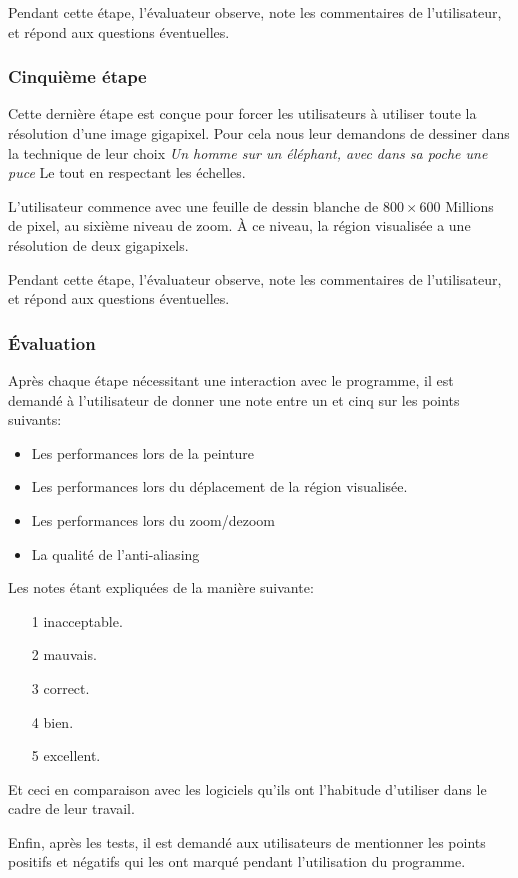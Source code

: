 			Pendant cette étape, l'évaluateur observe, note les commentaires de l'utilisateur, et répond aux questions
			éventuelles. 

			\subsubsection{Cinquième étape}
			Cette dernière étape est conçue pour forcer les utilisateurs à utiliser toute la résolution d'une image
			gigapixel. Pour cela nous leur demandons de dessiner dans la technique de leur choix \emph{Un homme sur
			un éléphant, avec dans sa poche une puce} Le tout en respectant les échelles. 

			L'utilisateur commence avec une feuille de dessin blanche de $800 \times 600$ Millions de pixel, au sixième
			niveau de zoom. À ce niveau, la région visualisée a une résolution de deux gigapixels.

			Pendant cette étape, l'évaluateur observe, note les commentaires de l'utilisateur, et répond aux questions
			éventuelles. 

			\subsubsection{Évaluation}
			Après chaque étape nécessitant une interaction avec le programme, il est demandé à l'utilisateur de donner
			une note entre un et cinq sur les points suivants:
			\begin{itemize}
				\item Les performances lors de la peinture
				\item Les performances lors du déplacement de la région visualisée.
				\item Les performances lors du zoom/dezoom
				\item La qualité de l'anti-aliasing
			\end{itemize}
			Les notes étant expliquées de la manière suivante:
			\begin{enumerate}
				\item[1] inacceptable.
				\item[2] mauvais.
				\item[3] correct.
				\item[4] bien.
				\item[5] excellent.
			\end{enumerate}
			Et ceci en comparaison avec les logiciels qu'ils ont l'habitude d'utiliser dans le cadre de leur travail. 

			Enfin, après les tests, il est demandé aux utilisateurs de mentionner les points positifs et négatifs qui les
			ont marqué pendant l'utilisation du programme. 
